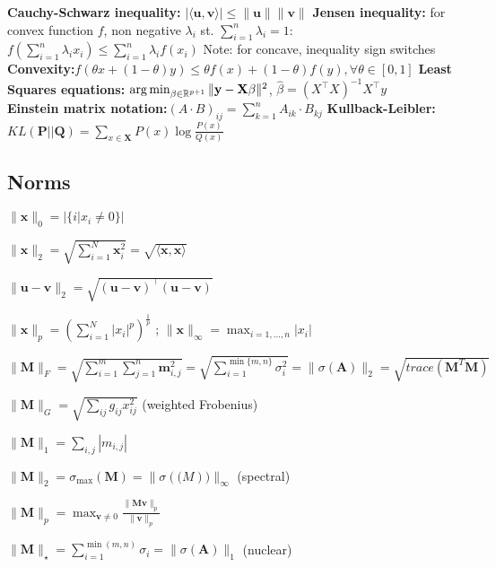 	\textbf{Cauchy-Schwarz inequality:} $|\langle\mathbf{u}, \mathbf{v}\rangle| \leq \|\mathbf{u}\|\|\mathbf{v}\|$
	\textbf{Jensen inequality:} for convex function $f$, non negative $\lambda_i$ st. $\sum_{i=1}^{n} \lambda_i = 1$: $f(\sum_{i=1}^{n} \lambda_ix_i) \leq \sum_{i=1}^{n}\lambda_if(x_i)$ Note: for concave, inequality sign switches
    \textbf{Convexity:}$f(\theta x+(1-\theta)y) \le \theta f(x)+(1-\theta)f(y), \forall\theta \in [0,1]$
    \textbf{Least Squares equations:} $\operatorname*{arg\,min}_{\beta \in \mathbb{R}^{p + 1}}\|\mathbf{y-X\beta}\|^2$, $\hat{\beta}=(X^{\top}X)^{-1}X^{\top}y$\\
    \textbf{Einstein matrix notation:}$(A \cdot B)_{ij} = \sum_{k=1}^n A_{ik} \cdot B_{kj}$
    \textbf{Kullback-Leibler:} $KL(\boldsymbol{P}||\boldsymbol{Q}) = \sum_{x \in \boldsymbol{X}} P(x)\log{\frac{P(x)}{Q(x)}}$
\subsection*{Norms}
\begin{inparaitem}
	\item $\|\mathbf{x}\|_0 = |\{i | x_i \neq 0\}|$ \\
	\item $\|\mathbf{x}\|_2 = \sqrt{\sum_{i=1}^{N} \mathbf{x}_i^2} = \sqrt{\langle \mathbf{x}, \mathbf{x} \rangle}$ \\
	\item $\|\mathbf{u}-\mathbf{v}\|_2 = \sqrt{(\mathbf{u}-\mathbf{v})^\top(\mathbf{u}-\mathbf{v})}$ \\
	\item $\|\mathbf{x}\|_p = \left( \sum_{i=1}^{N} |x_i|^p \right)^{\frac{1}{p}}$ ;
	$\|\mathbf{x}\|_\infty = \max_{i=1, \ldots , n} |x_i|$\\
	\item
	$\|\mathbf{M}\|_F =\allowbreak \sqrt{\sum_{i=1}^{m} \sum_{j=1}^{n}\mathbf{m}_{i,j}^2} = \sqrt{\sum_{i=1}^{\min\{m, n\}} \sigma_i^2} \allowbreak = \|\sigma(\mathbf{A})\|_2  = \sqrt{trace(\mathbf{M}^T\mathbf{M})} $\\
	\item $\|\mathbf{M}\|_G=\sqrt{\sum_{ij}{g_{ij}x^2_{ij}}}$ (weighted Frobenius) \\
	\item
	$\|\mathbf{M}\|_1 = \sum_{i,j} | m_{i,j}|$ \\
	\item $\|\mathbf{M}\|_2 = \sigma_{\text{max}}(\mathbf{M}) = \|\sigma(\mathbf(M))\|_\infty$ (spectral)\\
	\item $\|\mathbf{M}\|_p = \max_{\mathbf{v} \neq 0} \frac{\|\mathbf{M}\mathbf{v}\|_p}{\|\mathbf{v}\|_p}$ \\
	\item $\|\mathbf{M}\|_\star = \sum_{i=1}^{\min(m, n)} \sigma_i = \|\sigma(\mathbf{A})\|_1$ (nuclear)
\end{inparaitem}

